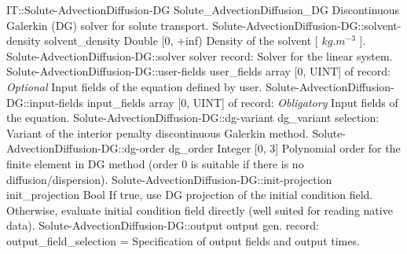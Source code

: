 \begin{RecordType}
	{IT::Solute-AdvectionDiffusion-DG}
	{Solute{\_}AdvectionDiffusion{\_}DG}
	{}%
	{}%
	{{{Discontinuous Galerkin (DG) solver for solute transport.}%
}}
		\RecKey
			{Solute-AdvectionDiffusion-DG::solvent-density}
			{solvent{\_}density}
			{{Double [0, +inf)}}{}
			{ }
			{{{Density of the solvent [ }{$kg.m^{-3}$}{ ].}%
}}
		\RecKey
			{Solute-AdvectionDiffusion-DG::solver}
			{solver}
			{{record: }}{}
			{ \ValueDefault{{\{}{\}}}}
			{{{Solver for the linear system.}%
}}
		\RecKey
			{Solute-AdvectionDiffusion-DG::user-fields}
			{user{\_}fields}
			{{array [0, UINT] of }{record: }}{}
			{ \it{Optional}}
			{{{Input fields of the equation defined by user.}%
}}
		\RecKey
			{Solute-AdvectionDiffusion-DG::input-fields}
			{input{\_}fields}
			{{array [0, UINT] of }{record: }}{}
			{ \it{Obligatory}}
			{{{Input fields of the equation.}%
}}
		\RecKey
			{Solute-AdvectionDiffusion-DG::dg-variant}
			{dg{\_}variant}
			{{selection: }}{}
			{ }
			{{{Variant of the interior penalty discontinuous Galerkin method.}%
}}
		\RecKey
			{Solute-AdvectionDiffusion-DG::dg-order}
			{dg{\_}order}
			{{Integer [0, 3]}}{}
			{ }
			{{{Polynomial order for the finite element in DG method (order 0 is suitable if there is no diffusion/dispersion).}%
}}
		\RecKey
			{Solute-AdvectionDiffusion-DG::init-projection}
			{init{\_}projection}
			{{Bool}}{}
			{ }
			{{{If true, use DG projection of the initial condition field.
Otherwise, evaluate initial condition field directly (well suited for reading native data).}%
}}
		\RecKey
			{Solute-AdvectionDiffusion-DG::output}
			{output}
			{{gen. record: }}{{output{\_}field{\_}selection}{ = }}
			{ }
			{{{Specification of output fields and output times.}%
}}
\end{RecordType}
